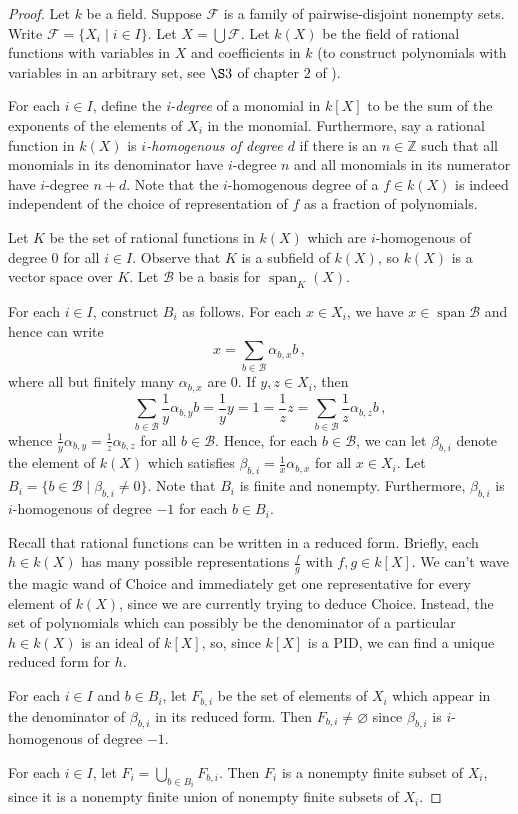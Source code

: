 \documentclass[12pt]{article}
\DeclareMathOperator{\spn}{span}
\let\emptyset\varnothing
\theoremstyle{definition}
\begin{document}
\begin{proof}
Let $k$ be a field. Suppose $\mathcal{F}$ is a family of pairwise-disjoint nonempty sets. Write $\mathcal{F} = \{X_i\mid i\in I\}$. Let $X = \bigcup\mathcal{F}$. Let $k(X)$ be the field of rational functions with variables in $X$ and coefficients in $k$ (to construct polynomials with variables in an arbitrary set, see $\S3$ of chapter $2$ of \cite{Lang}).

For each $i\in I$, define the \emph{i-degree} of a monomial in $k[X]$ to be the sum of the exponents of the elements of $X_i$ in the monomial. Furthermore, say a rational function in $k(X)$ is \emph{$i$-homogenous of degree $d$} if there is an $n\in\mathbb{Z}$ such that all monomials in its denominator have $i$-degree $n$ and all monomials in its numerator have $i$-degree $n+d$. Note that the $i$-homogenous degree of a $f\in k(X)$ is indeed independent of the choice of representation of $f$ as a fraction of polynomials.

Let $K$ be the set of rational functions in $k(X)$ which are $i$-homogenous of degree $0$ for all $i\in I$. Observe that $K$ is a subfield of $k(X)$, so $k(X)$ is a vector space over $K$. Let $\mathscr{B}$ be a basis for $\spn_K(X)$.

For each $i\in I$, construct $B_i$ as follows. For each $x\in X_i$, we have $x\in\spn\mathscr{B}$ and hence can write
\[
	x = \sum_{b\in\mathscr{B}} \alpha_{b,x} b\,,
\]
where all but finitely many $\alpha_{b,x}$ are $0$. If $y,z\in X_i$, then
\[
	\sum_{b\in\mathscr{B}} \frac{1}{y}\alpha_{b,y} b = \frac{1}{y}y = 1 = \frac{1}{z}z = \sum_{b\in\mathscr{B}} \frac{1}{z}\alpha_{b,z} b\,,
\]
whence $\frac{1}{y}\alpha_{b,y} = \frac{1}{z}\alpha_{b,z}$ for all $b\in\mathscr{B}$. Hence, for each $b\in\mathscr{B}$, we can let $\beta_{b,i}$ denote the element of $k(X)$ which satisfies $\beta_{b,i} = \frac{1}{x}\alpha_{b,x}$ for all $x\in X_i$. Let $B_i = \{b\in\mathscr{B} \mid \beta_{b,i}\neq 0\}$. Note that $B_i$ is finite and nonempty. Furthermore, $\beta_{b,i}$ is $i$-homogenous of degree $-1$ for each $b\in B_i$.

Recall that rational functions can be written in a reduced form. Briefly, each $h\in k(X)$ has many possible representations $\frac{f}{g}$ with $f,g\in k[X]$. We can't wave the magic wand of Choice and immediately get one representative for every element of $k(X)$, since we are currently trying to deduce Choice. Instead, the set of polynomials which can possibly be the denominator of a particular $h\in k(X)$ is an ideal of $k[X]$, so, since $k[X]$ is a PID, we can find a unique reduced form for $h$.

For each $i\in I$ and $b\in B_i$, let $F_{b,i}$ be the set of elements of $X_i$ which appear in the denominator of $\beta_{b,i}$ in its reduced form. Then $F_{b,i}\neq\emptyset$ since $\beta_{b,i}$ is $i$-homogenous of degree $-1$.

For each $i\in I$, let $F_i = \bigcup_{b\in B_i} F_{b,i}$. Then $F_i$ is a nonempty finite subset of $X_i$, since it is a nonempty finite union of nonempty finite subsets of $X_i$.
\end{proof}
\end{document}
